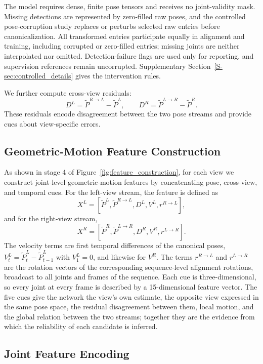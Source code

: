 \documentclass[preprint,12pt]{elsarticle}
\begin{document}
The model requires dense, finite pose tensors and receives no joint-validity mask. Missing detections are represented by zero-filled raw poses, and the controlled pose-corruption study replaces or perturbs selected raw entries before canonicalization. All transformed entries participate equally in alignment and training, including corrupted or zero-filled entries; missing joints are neither interpolated nor omitted. Detection-failure flags are used only for reporting, and supervision references remain uncorrupted. Supplementary Section~\ref{S-sec:controlled_details} gives the intervention rules.

We further compute cross-view residuals:
\[
D^{L} = \tilde{P}^{R \rightarrow L} - \tilde{P}^{L},
\qquad
D^{R} = \tilde{P}^{L \rightarrow R} - \tilde{P}^{R}.
\]
These residuals encode disagreement between the two pose streams and provide cues about view-specific errors.

\subsection{Geometric-Motion Feature Construction}
\label{subsec:feature_construction}

As shown in stage 4 of Figure~\ref{fig:feature_construction}, for each view we construct joint-level geometric-motion features by concatenating pose, cross-view, and temporal cues. For the left-view stream, the feature is defined as
\[
X^{L}
=
\left[
\tilde{P}^{L},
\tilde{P}^{R \rightarrow L},
D^{L},
V^{L},
r^{R \rightarrow L}
\right],
\]
and for the right-view stream,
\[
X^{R}
=
\left[
\tilde{P}^{R},
\tilde{P}^{L \rightarrow R},
D^{R},
V^{R},
r^{L \rightarrow R}
\right].
\]
The velocity terms are first temporal differences of the canonical poses, \(V^{L}_{t}=\tilde{P}^{L}_{t}-\tilde{P}^{L}_{t-1}\) with \(V^{L}_{1}=0\), and likewise for \(V^{R}\). The terms \(r^{R \rightarrow L}\) and \(r^{L \rightarrow R}\) are the rotation vectors of the corresponding sequence-level alignment rotations, broadcast to all joints and frames of the sequence. Each cue is three-dimensional, so every joint at every frame is described by a 15-dimensional feature vector. The five cues give the network the view's own estimate, the opposite view expressed in the same pose space, the residual disagreement between them, local motion, and the global relation between the two streams; together they are the evidence from which the reliability of each candidate is inferred.

\subsection{Joint Feature Encoding}
\label{subsec:joint_feature_encoding}
\end{document}
